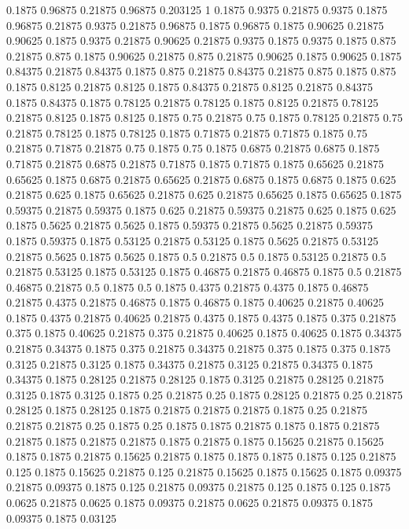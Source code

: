 0.1875 0.96875
0.21875 0.96875
0.203125 1
0.1875 0.9375
0.21875 0.9375
0.1875 0.96875
0.21875 0.9375
0.21875 0.96875
0.1875 0.96875
0.1875 0.90625
0.21875 0.90625
0.1875 0.9375
0.21875 0.90625
0.21875 0.9375
0.1875 0.9375
0.1875 0.875
0.21875 0.875
0.1875 0.90625
0.21875 0.875
0.21875 0.90625
0.1875 0.90625
0.1875 0.84375
0.21875 0.84375
0.1875 0.875
0.21875 0.84375
0.21875 0.875
0.1875 0.875
0.1875 0.8125
0.21875 0.8125
0.1875 0.84375
0.21875 0.8125
0.21875 0.84375
0.1875 0.84375
0.1875 0.78125
0.21875 0.78125
0.1875 0.8125
0.21875 0.78125
0.21875 0.8125
0.1875 0.8125
0.1875 0.75
0.21875 0.75
0.1875 0.78125
0.21875 0.75
0.21875 0.78125
0.1875 0.78125
0.1875 0.71875
0.21875 0.71875
0.1875 0.75
0.21875 0.71875
0.21875 0.75
0.1875 0.75
0.1875 0.6875
0.21875 0.6875
0.1875 0.71875
0.21875 0.6875
0.21875 0.71875
0.1875 0.71875
0.1875 0.65625
0.21875 0.65625
0.1875 0.6875
0.21875 0.65625
0.21875 0.6875
0.1875 0.6875
0.1875 0.625
0.21875 0.625
0.1875 0.65625
0.21875 0.625
0.21875 0.65625
0.1875 0.65625
0.1875 0.59375
0.21875 0.59375
0.1875 0.625
0.21875 0.59375
0.21875 0.625
0.1875 0.625
0.1875 0.5625
0.21875 0.5625
0.1875 0.59375
0.21875 0.5625
0.21875 0.59375
0.1875 0.59375
0.1875 0.53125
0.21875 0.53125
0.1875 0.5625
0.21875 0.53125
0.21875 0.5625
0.1875 0.5625
0.1875 0.5
0.21875 0.5
0.1875 0.53125
0.21875 0.5
0.21875 0.53125
0.1875 0.53125
0.1875 0.46875
0.21875 0.46875
0.1875 0.5
0.21875 0.46875
0.21875 0.5
0.1875 0.5
0.1875 0.4375
0.21875 0.4375
0.1875 0.46875
0.21875 0.4375
0.21875 0.46875
0.1875 0.46875
0.1875 0.40625
0.21875 0.40625
0.1875 0.4375
0.21875 0.40625
0.21875 0.4375
0.1875 0.4375
0.1875 0.375
0.21875 0.375
0.1875 0.40625
0.21875 0.375
0.21875 0.40625
0.1875 0.40625
0.1875 0.34375
0.21875 0.34375
0.1875 0.375
0.21875 0.34375
0.21875 0.375
0.1875 0.375
0.1875 0.3125
0.21875 0.3125
0.1875 0.34375
0.21875 0.3125
0.21875 0.34375
0.1875 0.34375
0.1875 0.28125
0.21875 0.28125
0.1875 0.3125
0.21875 0.28125
0.21875 0.3125
0.1875 0.3125
0.1875 0.25
0.21875 0.25
0.1875 0.28125
0.21875 0.25
0.21875 0.28125
0.1875 0.28125
0.1875 0.21875
0.21875 0.21875
0.1875 0.25
0.21875 0.21875
0.21875 0.25
0.1875 0.25
0.1875 0.1875
0.21875 0.1875
0.1875 0.21875
0.21875 0.1875
0.21875 0.21875
0.1875 0.21875
0.1875 0.15625
0.21875 0.15625
0.1875 0.1875
0.21875 0.15625
0.21875 0.1875
0.1875 0.1875
0.1875 0.125
0.21875 0.125
0.1875 0.15625
0.21875 0.125
0.21875 0.15625
0.1875 0.15625
0.1875 0.09375
0.21875 0.09375
0.1875 0.125
0.21875 0.09375
0.21875 0.125
0.1875 0.125
0.1875 0.0625
0.21875 0.0625
0.1875 0.09375
0.21875 0.0625
0.21875 0.09375
0.1875 0.09375
0.1875 0.03125
